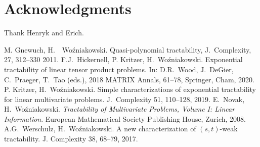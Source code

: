 \documentclass[11pt,a4paper]{article}
\begin{document}
\section{Acknowledgments}
Thank Henryk and Erich.

\begin{thebibliography}{99}
 M. Gnewuch, H.~~Wo\'zniakowski. Quasi-polynomial tractability, J.~Complexity, 27, 312--330 2011.
 F.J.~Hickernell, P. Kritzer, H.~Wo\'zniakowski.  Exponential tractability of linear tensor product problems. In:
D.R.~Wood, J.~DeGier, C.~Praeger, T.~Tao (eds.), 2018 MATRIX Annals, 61--78, Springer, Cham, 2020.
 P. Kritzer, H.~Wo\'zniakowski.
Simple characterizations of exponential tractability for linear
multivariate problems. J.~Complexity 51, 110--128, 2019.
 E.~Novak, H.~Wo\'zniakowski. \textit{Tractability of Multivariate Problems, Volume I: Linear Information}.
European Mathematical Society Publishing House, Zurich, 2008.
  A.G.~Werschulz, H.~Wo\'zniakowski. A new characterization of $(s,t)$-weak tractability. J. Complexity 38, 68--79, 2017.


\end{thebibliography}
\end{document}
